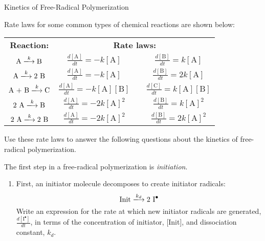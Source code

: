 \begin{activity}{Kinetics of Free-Radical Polymerization}
\begin{instructornotes}
\end{instructornotes}


\begin{model}
	\label{\labelbase:mdl:kineticeqns}

	Rate laws for some common types of chemical reactions are shown below:
	
	\vspace{-6pt}
	\begin{center}
		\renewcommand{\arraystretch}{2}
		\begin{tabular}{c c c c}
			\hspace{2cm}\textbf{Reaction:}\hspace{2cm} & \multicolumn{3}{c}{\hspace{0.5cm}\textbf{Rate laws:}\hspace{0.5cm}} \\
			$ \text{A} \xlongrightarrow{k} \text{B}$ & $\frac{d[\text{A}]}{dt} = -k[\text{A}]$ && $\frac{d[\text{B}]}{dt} = k[\text{A}]$ \\
			$ \text{A} \xlongrightarrow{k} 2\text{ B}$ & $\frac{d[\text{A}]}{dt} = -k[\text{A}]$ && $\frac{d[\text{B}]}{dt} = 2k[\text{A}]$ \\
			$\text{A + B} \xlongrightarrow{k} \text{C}$ & $\frac{d[\text{A}]}{dt} = -k[\text{A}][\text{B}]$ && $\frac{d[\text{C}]}{dt} = k[\text{A}][\text{B}]$ \\
			$\text{2 A} \xlongrightarrow{k} \text{B}$ & $\frac{d[\text{A}]}{dt} = -2k[\text{A}]^2$ && $\frac{d[\text{B}]}{dt} = k[\text{A}]^2$ \\
			$\text{2 A} \xlongrightarrow{k} \text{2 B}$ & $\frac{d[\text{A}]}{dt} = -2k[\text{A}]^2$ && $\frac{d[\text{B}]}{dt} = 2 k[\text{A}]^2$ 
		\end{tabular}
	\end{center}
	Use these rate laws to answer the following questions about the kinetics of free-radical polymerization.
	
\end{model}


\begin{ctqs}

	\question The first step in a free-radical polymerization is \emph{initiation}.  
		
		\begin{enumerate}
		
			\item First, an initiator molecule decomposes to create initiator radicals: \label{\labelbase:ctq:initdecomp}
				\begin{equation*}
					\text{Init} \xlongrightarrow{k_d} \text{2 \ce{I^.}}
				\end{equation*}	
				Write an expression for the rate at which new initiator radicals are generated, $\frac{d[\text{I}^{\bullet}]}{dt}$, in terms of the concentration of initiator, [Init], and dissociation constant, $k_d$.
		

\end{enumerate}
\end{ctqs}
\end{activity}
